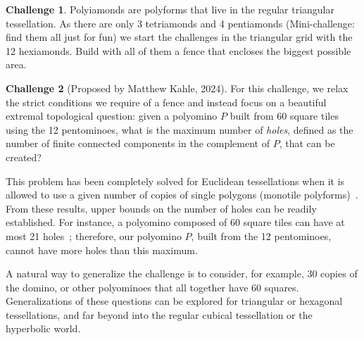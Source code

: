 \documentclass{amsart}
\theoremstyle{definition}
\newtheorem{challenge}{Challenge}
\theoremstyle{remark}
\begin{document}
	
	\begin{challenge} \label{challenge:polyiamonds}
		Polyiamonds are polyforms that live in the regular triangular tessellation. As there are only 3 tetriamonds and 4 pentiamonds (Mini-challenge: find them all just for fun) we start the challenges in the triangular grid with the 12 hexiamonds. Build with all of them a fence that encloses the biggest possible area. 
	\end{challenge}
	
	\begin{challenge}[Proposed by Matthew Kahle, 2024]
		For this challenge, we relax the strict conditions we require of a fence and instead focus on a beautiful extremal topological question: given a polyomino $P$ built from 60 square tiles using the 12 pentominoes, what is the maximum number of \emph{holes}, defined as the number of finite connected components in the complement of $P$, that can be created?
		
		This problem has been completely solved for Euclidean tessellations when it is allowed to use a given number of copies of single polygons (monotile polyforms)~\cite{KR19, MaR, malen2021extremalI, malen2021extremalII}. From these results, upper bounds on the number of holes can be readily established. For instance, a polyomino composed of 60 square tiles can have at most 21 holes~\cite{KR19}; therefore, our polyomino $P$, built from the 12 pentominoes, cannot have more holes than this maximum.
		
		A natural way to generalize the challenge is to consider, for example, 30 copies of the domino, or other polyominoes that all together have 60 squares. Generalizations of these questions can be explored for triangular or hexagonal tessellations, and far beyond into the regular cubical tessellation or the hyperbolic world.
	\end{challenge}
	
\end{document}
